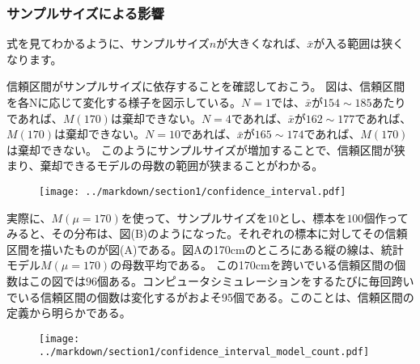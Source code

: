 \documentclass[a4paper,11pt,dvipdfmx]{jsarticle}
\begin{document}
\subsubsection{サンプルサイズによる影響}
式を見てわかるように、サンプルサイズ$n$が大きくなれば、$\bar{x}$が入る範囲は狭くなります。

信頼区間がサンプルサイズに依存することを確認しておこう。
図は、信頼区間を各Nに応じて変化する様子を図示している。$N=1$では、$\bar{x}$が$154\sim185$あたりであれば、$M(170)$は棄却できない。$N=4$であれば、$\bar{x}$が$162\sim177$であれば、$M(170)$は棄却できない。$N=10$であれば、$\bar{x}$が$165\sim174$であれば、$M(170)$は棄却できない。
このようにサンプルサイズが増加することで、信頼区間が狭まり、棄却できるモデルの母数の範囲が狭まることがわかる。
\begin{figure}

\begin{center}
    \texttt{[image: ../markdown/section1/confidence\_interval.pdf]}
  \end{center}
\end{figure}


実際に、$M(\mu=170)$を使って、$サンプルサイズを10$とし、標本を$100$個作ってみると、その分布は、図(B)のようになった。それぞれの標本に対してその信頼区間を描いたものが図(A)である。図Aの170cmのところにある縦の線は、統計モデル$M(\mu=170)$の母数平均である。
この170cmを跨いでいる信頼区間の個数はこの図では$96$個ある。コンピュータシミュレーションをするたびに毎回跨いでいる信頼区間の個数は変化するがおよそ95個である。このことは、信頼区間の定義から明らかである。


\begin{figure}
\begin{center}
    \texttt{[image: ../markdown/section1/confidence\_interval\_model\_count.pdf]}
  \end{center}
\end{figure}
\end{document}
